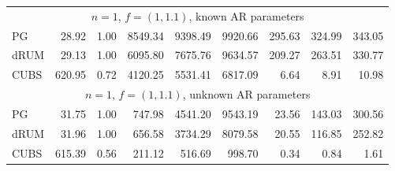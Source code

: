 \documentclass[12pt]{article}
\begin{document}
\begin{table}
\begin{center}
\begin{tabular}{l r r r r r r r r }

      \multicolumn{9}{c}{$n=1$, $f = (1,1.1)$, known AR parameters} \\
      PG     &    28.92 &     1.00 &   8549.34 &   9398.49 &   9920.66 &    295.63 &    324.99 &    343.05 \\
      dRUM   &    29.13 &     1.00 &   6095.80 &   7675.76 &   9634.57 &    209.27 &    263.51 &    330.77 \\
      CUBS   &   620.95 &     0.72 &   4120.25 &   5531.41 &   6817.09 &      6.64 &      8.91 &     10.98
      \\ %


      \multicolumn{9}{c}{$n=1$, $f = (1,1.1)$, unknown AR parameters} \\
      PG     &    31.75 &     1.00 &    747.98 &   4541.20 &   9543.19 &     23.56 &    143.03 &    300.56 \\
      dRUM   &    31.96 &     1.00 &    656.58 &   3734.29 &   8079.58 &     20.55 &    116.85 &    252.82 \\
      CUBS   &   615.39 &     0.56 &    211.12 &    516.69 &    998.70 & 0.34 &      0.84 &      1.61
      \\ %


\end{tabular}
\end{center}
\end{table}
\end{document}
